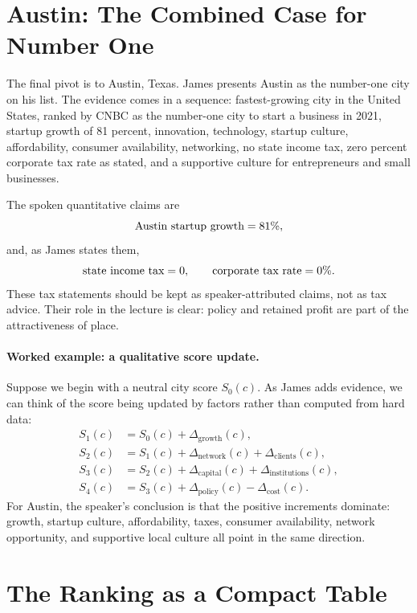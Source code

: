 \section{Austin: The Combined Case for Number One}

The final pivot is to Austin, Texas. James presents Austin as the number-one city on his list. The evidence comes in a sequence: fastest-growing city in the United States, ranked by CNBC as the number-one city to start a business in 2021, startup growth of 81 percent, innovation, technology, startup culture, affordability, consumer availability, networking, no state income tax, zero percent corporate tax rate as stated, and a supportive culture for entrepreneurs and small businesses.

The spoken quantitative claims are
\begin{equation}
\hbox{Austin startup growth}=81\%,
\end{equation}
and, as James states them,
\begin{equation}
\hbox{state income tax}=0,
\qquad
\hbox{corporate tax rate}=0\%.
\end{equation}
These tax statements should be kept as speaker-attributed claims, not as tax advice. Their role in the lecture is clear: policy and retained profit are part of the attractiveness of place.

\paragraph{Worked example: a qualitative score update.}
Suppose we begin with a neutral city score \(S_0(c)\). As James adds evidence, we can think of the score being updated by factors rather than computed from hard data:
\begin{align}
S_1(c) &= S_0(c)+\Delta_{\text{growth}}(c),\\
S_2(c) &= S_1(c)+\Delta_{\text{network}}(c)+\Delta_{\text{clients}}(c),\\
S_3(c) &= S_2(c)+\Delta_{\text{capital}}(c)+\Delta_{\text{institutions}}(c),\\
S_4(c) &= S_3(c)+\Delta_{\text{policy}}(c)-\Delta_{\text{cost}}(c).
\end{align}
For Austin, the speaker's conclusion is that the positive increments dominate: growth, startup culture, affordability, taxes, consumer availability, network opportunity, and supportive local culture all point in the same direction.

\section{The Ranking as a Compact Table}

